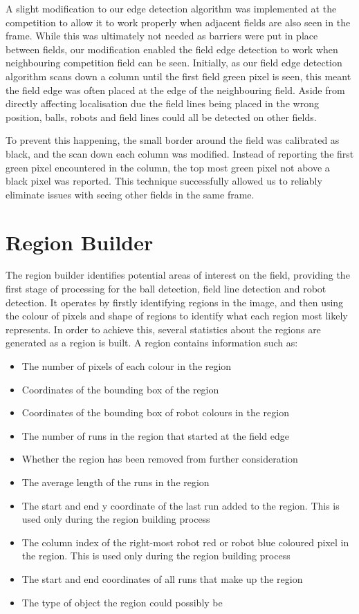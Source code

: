 \documentclass[pdftex,11pt,a4paper]{report}
\begin{document}
A slight modification to our edge detection algorithm was implemented at the competition to allow it to work properly when adjacent fields are also seen in the frame. While this was ultimately not needed as barriers were put in place between fields, our modification enabled the field edge detection to work when neighbouring competition field can be seen. Initially, as our field edge detection algorithm scans down a column until the first field green pixel is seen, this meant the field edge was often placed at the edge of the neighbouring field. Aside from directly affecting localisation due the field lines being placed in the wrong position, balls, robots and field lines could all be detected on other fields.

To prevent this happening, the small border around the field was calibrated as
black, and the scan down each column was modified. Instead of reporting the
first green pixel encountered in the column, the top most green pixel not above
a black pixel was reported. This technique successfully allowed us to reliably
eliminate issues with seeing other fields in the same frame.

\section{Region Builder}
The region builder identifies potential areas of interest on the field, providing the first stage of processing for the ball detection, field line detection and robot detection. It operates by firstly identifying regions in the image, and then using the colour of pixels and shape of regions to identify what each region most likely represents. In order to achieve this, several statistics about the regions are generated as a region is built. A region contains information such as: \begin{itemize}
\item{The number of pixels of each colour in the region}
\item{Coordinates of the bounding box of the region}
\item{Coordinates of the bounding box of robot colours in the region}
\item{The number of runs in the region that started at the field edge}
\item{Whether the region has been removed from further consideration}
\item{The average length of the runs in the region}
\item{The start and end y coordinate of the last run added to the region. This is used only during the region building process}
\item{The column index of the right-most robot red or robot blue coloured pixel in the region. This is used only during the region building process}
\item{The start and end coordinates of all runs that make up the region}
\item{The type of object the region could possibly be}
\end{itemize}
\end{document}
